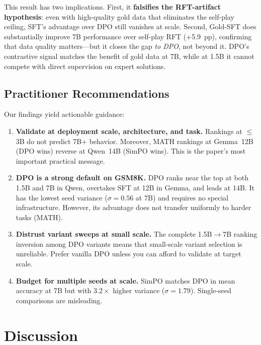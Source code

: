 \documentclass{article}
\begin{document}
This result has two implications. First, it \textbf{falsifies the RFT-artifact hypothesis}: even with high-quality gold data that eliminates the self-play ceiling, SFT's advantage over DPO still vanishes at scale. Second, Gold-SFT does substantially improve 7B performance over self-play RFT (+5.9~pp), confirming that data quality matters---but it closes the gap \emph{to DPO}, not beyond it. DPO's contrastive signal matches the benefit of gold data at 7B, while at 1.5B it cannot compete with direct supervision on expert solutions.

\subsection{Practitioner Recommendations}
\label{sec:recommendations}

Our findings yield actionable guidance:
\begin{enumerate}[leftmargin=*,itemsep=1pt]
    \item \textbf{Validate at deployment scale, architecture, and task.} Rankings at $\leq$3B do not predict 7B+ behavior. Moreover, MATH rankings at Gemma~12B (DPO wins) reverse at Qwen~14B (SimPO wins). This is the paper's most important practical message.
    \item \textbf{DPO is a strong default on GSM8K.} DPO ranks near the top at both 1.5B and 7B in Qwen, overtakes SFT at 12B in Gemma, and leads at 14B. It has the lowest seed variance ($\sigma = 0.56$ at 7B) and requires no special infrastructure. However, its advantage does not transfer uniformly to harder tasks (MATH).
    \item \textbf{Distrust variant sweeps at small scale.} The complete 1.5B$\to$7B ranking inversion among DPO variants means that small-scale variant selection is unreliable. Prefer vanilla DPO unless you can afford to validate at target scale.
    \item \textbf{Budget for multiple seeds at scale.} SimPO matches DPO in mean accuracy at 7B but with $3.2\times$ higher variance ($\sigma = 1.79$). Single-seed comparisons are misleading.
\end{enumerate}

\section{Discussion}
\label{sec:discussion}
\end{document}
